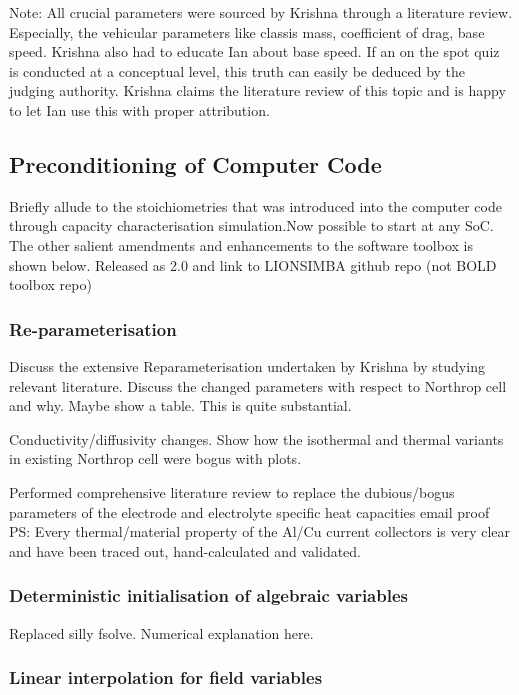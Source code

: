Note:  All crucial  parameters  were  sourced by  Krishna  through a  literature
review. Especially, the  vehicular parameters like classis  mass, coefficient of
drag, base speed. Krishna also had to educate Ian about base speed. If an on the
spot quiz is conducted  at a conceptual level, this truth  can easily be deduced
by the judging authority. Krishna claims the literature review of this topic and
is happy to let Ian use this with proper attribution.

\subsection{Preconditioning of Computer Code}

Briefly allude to the stoichiometries that was introduced into the computer code
through capacity characterisation  simulation.Now possible to start  at any SoC.
The other salient  amendments and enhancements to the software  toolbox is shown
below. Released as 2.0 and link to LIONSIMBA github repo (not BOLD toolbox repo)

\subsubsection{Re-parameterisation}

Discuss  the  extensive Reparameterisation  undertaken  by  Krishna by  studying
relevant literature.  Discuss the  changed parameters  with respect  to Northrop
cell and why. Maybe show a table. This is quite substantial.

Conductivity/diffusivity changes.  Show how the isothermal  and thermal variants
in existing Northrop cell were bogus with plots.

Performed  comprehensive   literature  review   to  replace   the  dubious/bogus
parameters of the electrode and electrolyte specific heat capacities email proof
PS:  Every thermal/material  property of  the Al/Cu  current collectors  is very
clear and have been traced out, hand-calculated and validated.

\subsubsection{Deterministic initialisation  of algebraic variables}

Replaced silly fsolve. Numerical explanation here.

\subsubsection{Linear interpolation for field variables}

